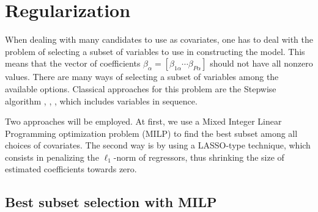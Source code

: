 \section{Regularization}

When dealing with many candidates to use as covariates, one has to deal with the problem of selecting a subset of variables to use in constructing the model. 
This means that the vector of coefficients $\beta_\alpha = [ \beta_{1 \alpha} \cdots \beta_{P\alpha} ]$ should not have all nonzero values.
There are many ways of selecting a subset of variables among the available options.
Classical approaches for this problem are the Stepwise algorithm \cite{efroymson1960multiple}, \cite{hocking_selection_1967}, \cite{tibshirani1996regression}, which includes variables in sequence. 

Two approaches will be employed. At first, we use a Mixed Integer Linear Programming optimization problem (MILP) to find the best subset among all choices of covariates. The second way is by using a LASSO-type technique, which consists in penalizing the $\ell_1$-norm of regressors, thus shrinking the size of estimated coefficients towards zero.  

\subsection{Best subset selection with MILP}
\label{sec:best-subset-mip}

